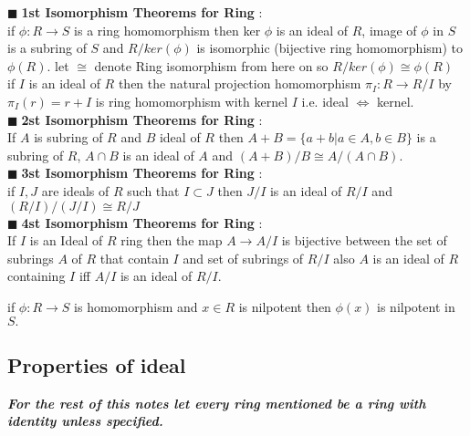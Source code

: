 \documentclass[11pt]{extarticle}
\newcommand{\ra}{\rightarrow}
\newcommand{\tbx}[2][]{
	\begin{tcolorbox}[enhanced,breakable,size=small,colback=black!2!white,title={#1},arc is angular, arc=1.5mm,drop fuzzy shadow]
		#2
	\end{tcolorbox}
}
\newcommand{\y}{$\blacksquare\;$}
\begin{document}
\begin{multicols}{2}
{			} 
\tbx[\textbf{Isomorphism Theorems for Ring}]{
			\y \textbf{1st Isomorphism Theorems for Ring} : \\ 
			if $ \phi : R\ra S $ is a ring homomorphism then ker $ \phi $ is an ideal of $ R $, image of $ \phi $ in $ S $ is a subring of $ S $ and $ R/ker(\phi) $ is isomorphic (bijective ring homomorphism) to $ \phi(R) .$ let $ \cong $ denote Ring isomorphism from here on so $ R/ker(\phi)\cong \phi(R) $\\
			if $ I $ is an ideal of $ R $ then the natural projection homomorphism $ \pi_I:R \ra R/I $ by $ \pi_I(r)=r+I $ is ring homomorphism   with kernel $ I $ i.e. ideal $ \iff $ kernel.\\
			\y  \textbf{2st Isomorphism Theorems for Ring} : \\ 
			If $ A $ is subring of $ R $ and $ B $ ideal of  $ R $ then $ A+B=\{a+b|a\in A,b\in B\} $ is a subring of $ R $, $ A\cap B $ is an ideal of $ A $ and $ (A+B)/B\cong A/(A\cap B) .$\\
			\y  \textbf{3st Isomorphism Theorems for Ring} : \\ 
			if $ I,J $ are ideals of $ R $ such that $ I	\subset J $ then $ J/I $ is an ideal of $ R/I $ and $ (R/I)/(J/I)\cong R/J $\\
			\y \textbf{4st Isomorphism Theorems for Ring} :  \\
			If $ I $ is an Ideal of $ R $ ring then the map $ A\ra A/I $ is bijective between the set of subrings $ A $ of $ R $ that contain $ I $ and set of subrings of $ R/I $ also $ A $ is an ideal of $ R $ containing $ I $ iff $ A/I $ is an ideal of $ R/I .$
			} 
\tbx{if $ \phi : R \ra S $ is homomorphism and $ x	\in  R$ is nilpotent then $ \phi(x) $ is nilpotent in $ S. $}
			\subsection{Properties of ideal}
			\begin{tcolorbox}[enhanced,size=title,colback=black!5!white,arc is angular, arc=1.5mm,drop fuzzy shadow]
				\textbf{\emph{For the rest of this notes let every ring mentioned be a ring with identity unless specified.}}
			\end{tcolorbox}
			

\end{multicols}
\end{document}
